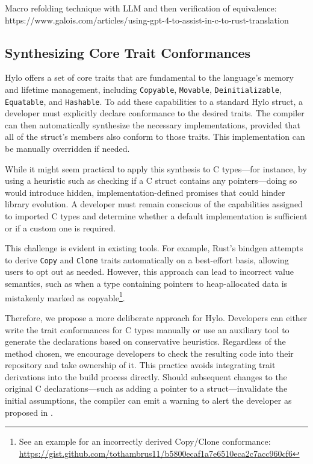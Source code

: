 Macro refolding technique with LLM and then verification of equivalence: https://www.galois.com/articles/using-gpt-4-to-assist-in-c-to-rust-translation

\subsection{Synthesizing Core Trait Conformances}

Hylo offers a set of core traits that are fundamental to the language's memory and lifetime management, including \texttt{Copyable}, \texttt{Movable}, \texttt{Deinitializable}, \texttt{Equatable}, and \texttt{Hashable}. To add these capabilities to a standard Hylo struct, a developer must explicitly declare conformance to the desired traits. The compiler can then automatically synthesize the necessary implementations, provided that all of the struct's members also conform to those traits. This implementation can be manually overridden if needed.

While it might seem practical to apply this synthesis to C types—for instance, by using a heuristic such as checking if a C struct contains any pointers—doing so would introduce hidden, implementation-defined promises that could hinder library evolution. A developer must remain conscious of the capabilities assigned to imported C types and determine whether a default implementation is sufficient or if a custom one is required.

This challenge is evident in existing tools. For example, Rust's bindgen attempts to derive \texttt{Copy} and \texttt{Clone} traits automatically on a best-effort basis, allowing users to opt out as needed\cite{bindgen-nocopy}. However, this approach can lead to incorrect value semantics, such as when a type containing pointers to heap-allocated data is mistakenly marked as copyable\footnote{See an example for an incorrectly derived Copy/Clone conformance: \url{https://gist.github.com/tothambrus11/b5800ecaf1a7e6510eca2c7acc960cf6}}.

Therefore, we propose a more deliberate approach for Hylo. Developers can either write the trait conformances for C types manually or use an auxiliary tool to generate the declarations based on conservative heuristics. Regardless of the method chosen, we encourage developers to check the resulting code into their repository and take ownership of it. This practice avoids integrating trait derivations into the build process directly. Should subsequent changes to the original C declarations—such as adding a pointer to a struct—invalidate the initial assumptions, the compiler can emit a warning to alert the developer as proposed in \cite{hylo-trait-ptr-conformance-warning}.


